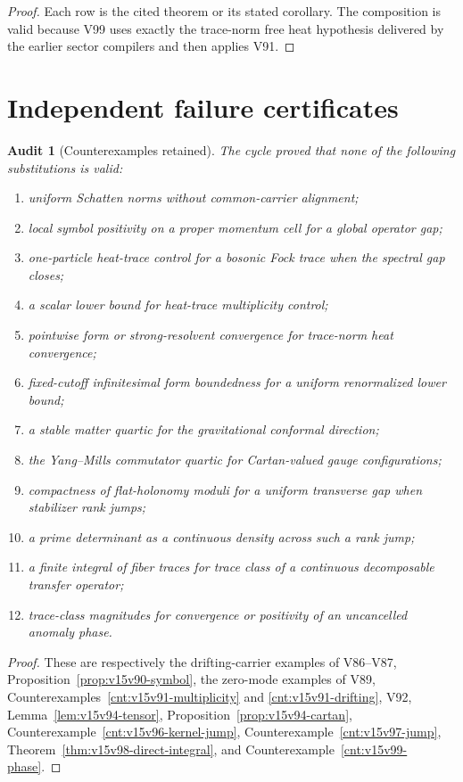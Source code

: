 \documentclass[11pt]{article}
\newtheorem{audit}[theorem]{Audit}
\theoremstyle{remark}
\begin{document}
\begin{proof}
Each row is the cited theorem or its stated corollary.  The
composition is valid because V99 uses exactly the trace-norm free
heat hypothesis delivered by the earlier sector compilers and then
applies V91.
\end{proof}

\section{Independent failure certificates}

\begin{audit}[Counterexamples retained]
\label{aud:v15v100-counterexamples}
The cycle proved that none of the following substitutions is valid:
\begin{enumerate}
\item uniform Schatten norms without common-carrier alignment;
\item local symbol positivity on a proper momentum cell for a
      global operator gap;
\item one-particle heat-trace control for a bosonic Fock trace when
      the spectral gap closes;
\item a scalar lower bound for heat-trace multiplicity control;
\item pointwise form or strong-resolvent convergence for
      trace-norm heat convergence;
\item fixed-cutoff infinitesimal form boundedness for a uniform
      renormalized lower bound;
\item a stable matter quartic for the gravitational conformal
      direction;
\item the Yang--Mills commutator quartic for Cartan-valued gauge
      configurations;
\item compactness of flat-holonomy moduli for a uniform transverse
      gap when stabilizer rank jumps;
\item a prime determinant as a continuous density across such a
      rank jump;
\item a finite integral of fiber traces for trace class of a
      continuous decomposable transfer operator;
\item trace-class magnitudes for convergence or positivity of an
      uncancelled anomaly phase.
\end{enumerate}
\end{audit}

\begin{proof}
These are respectively the drifting-carrier examples of V86--V87,
Proposition~\ref{prop:v15v90-symbol}, the zero-mode examples of V89,
Counterexamples~\ref{cnt:v15v91-multiplicity} and
\ref{cnt:v15v91-drifting}, V92,
Lemma~\ref{lem:v15v94-tensor},
Proposition~\ref{prop:v15v94-cartan},
Counterexample~\ref{cnt:v15v96-kernel-jump},
Counterexample~\ref{cnt:v15v97-jump},
Theorem~\ref{thm:v15v98-direct-integral}, and
Counterexample~\ref{cnt:v15v99-phase}.
\end{proof}
\end{document}
